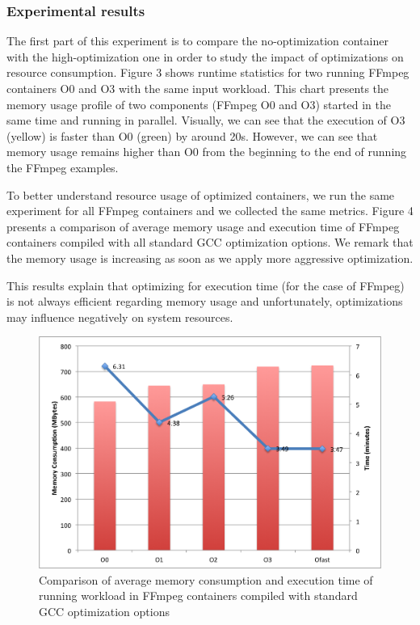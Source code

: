 \subsubsection{Experimental results}

The first part of this experiment is to compare the no-optimization container with the high-optimization one in order to study the impact of optimizations on resource consumption. Figure 3 shows runtime statistics for two running FFmpeg containers O0 and O3 with the same input workload. This chart presents the memory usage profile of two components (FFmpeg O0 and O3) started in the same time and running in parallel. Visually, we can see that the execution of O3 (yellow) is faster than O0 (green) by around 20s. However, we can see that memory usage remains higher than O0 from the beginning to the end of running the FFmpeg examples. 

To better understand resource usage of optimized containers, we run the same experiment for all FFmpeg containers and we collected the same metrics. Figure 4 presents a comparison of average memory usage and execution time of FFmpeg containers compiled with all standard GCC optimization options. We remark that the memory usage is increasing as soon as we apply more aggressive optimization.

This results explain that optimizing for execution time (for the case of FFmpeg) is not always efficient regarding memory usage and unfortunately, optimizations may influence negatively on system resources. 
\begin{figure}[h]
	\centering
	\includegraphics[scale=0.5]{Ressources/infra_ffmpeg_plot1.png}
	\caption{Comparison of average memory consumption and execution time of running workload in FFmpeg containers compiled with standard GCC optimization options}
\end{figure}



